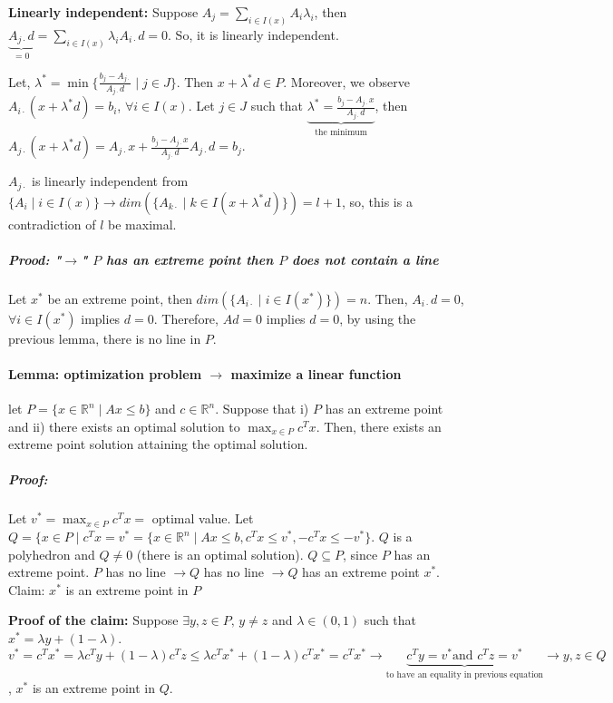 \documentclass[main]{subfiles}
\begin{document}
\begin{adjustwidth}{2.5em}{0pt}
\textbf{Linearly independent:} Suppose $A_{j} = \sum_{i \in I(x)} A_{i}\lambda_{i}$, then $\underbrace{A_{j\cdot}d}_{=0} = \sum_{i \in I(x)} \lambda_{i} A_{i\cdot} d = 0$. So, it is linearly independent.
\end{adjustwidth}

Let, $\lambda^{*} = \min \{\frac{b_{j} - A_{j\cdot}}{A_{j\cdot}d} \mid j \in J \}$. Then $x + \lambda^{*} d \in P$. Moreover, we observe $A_{i\cdot}(x + \lambda^{*}d) = b_{i}$, $\forall i \in I(x)$.
Let $j \in J$ such that $\underbrace{ \lambda^{*} = \frac{b_{j} - A_{j\cdot}x}{A_{j\cdot}d}}_{\text{the minimum}}$, then $A_{j\cdot}(x + \lambda^{*}d) = A_{j\cdot}x + \frac{b_{j} - A_{j\cdot}x}{A_{j\cdot}d} A_{j\cdot}d = b_{j}$.

$A_{j\cdot}$ is linearly independent from $\{A_{i} \mid i \in I(x) \} \rightarrow dim(\{A_{k\cdot} \mid k \in I(x + \lambda^{*}d)\}) = l+1$, so, this is a contradiction of $l$ be maximal.

\subparagraph{Prood: "$\rightarrow$" $P$ has an extreme point then $P$ does not contain a line}
Let $x^{*}$ be an extreme point, then $dim(\{A_{i\cdot} \mid i \in I(x^{*})\}) = n$. Then, $A_{i\cdot}d = 0$, $\forall i \in I(x^{*})$ implies $d=0$. Therefore, $Ad=0$ implies $d=0$, by using the previous lemma, there is no line in $P$.

\paragraph{Lemma: optimization problem $\rightarrow$ maximize a linear function}
let $P = \{ x \in \mathbb{R}^{n} \mid Ax \leq b \}$ and $c \in \mathbb{R}^{n}$. Suppose that i) $P$ has an extreme point and ii) there exists an optimal solution to $\displaystyle \max_{x \in P} c^{T}x$. Then, there exists an extreme point solution attaining the optimal solution.

\subparagraph{Proof:} Let $v^{*} = \displaystyle \max_{x \in P} c^{T}x =$ optimal value.
Let $Q = \{x \in P \mid c^{T}x = v^{*} = \{x \in \mathbb{R}^{n} \mid Ax \leq b, c^{T}x \leq v^{*}, -c^{T}x \leq -v^{*} \}$. $Q$ is a polyhedron and $Q \neq 0$ (there is an optimal solution).
$Q \subseteq P$, since $P$ has an extreme point.
$P$ has no line $\rightarrow Q$ has no line $\rightarrow Q$ has an extreme point $x^{*}$.
Claim: $x^{*}$ is an extreme point in $P$
\begin{adjustwidth}{2.5em}{0pt}
\textbf{Proof of the claim:}
Suppose $\exists y, z \in P \text{, } y \neq z$ and $ \lambda \in (0,1)$ such that $x^{*} = \lambda y + (1-\lambda) $.
$v^{*} = c^{T}x^{*} = \lambda c^{T}y + (1-\lambda)c^{T}z \leq \lambda c^{T}x^{*} + (1-\lambda)c^{T}x^{*} = c^{T}x^{*} \rightarrow \underbrace{ c^{T}y = v^{*} \text{and }c^{T}z = v^{*}}_{\text{to have an equality in previous equation}} \rightarrow y, z \in Q$, $x^{*}$ is an extreme point in $Q$.
\end{adjustwidth}
\end{document}
